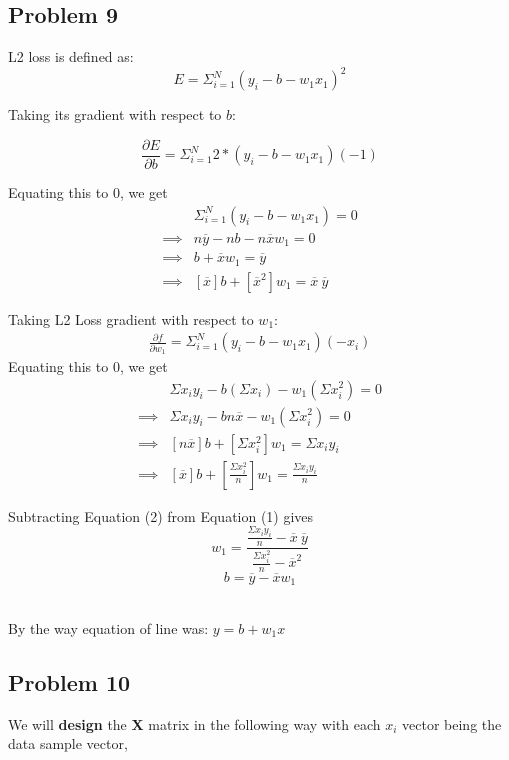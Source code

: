 \documentclass[12pt]{article}
\begin{document}
\subsection{Problem 9}

L2 loss is defined as:
\[E = \Sigma_{i=1}^N (y_i - b - w_1 x_1)^2 \]

Taking its gradient with respect to $b$:

\[\frac{\partial E}{\partial b} = \Sigma_{i=1}^N 2*(y_i - b - w_1 x_1)(-1)\]

Equating this to 0, we get 
\begin{align}
&\Sigma_{i=1}^N (y_i - b - w_1 x_1) = 0 \nonumber \\ 
\implies & n\overline{y} - nb - n\overline{x}w_1 = 0 \nonumber\\ 
\implies & b + \overline{x}w_1 = \overline{y} \nonumber \\
\implies & [\overline{x}]b + [\overline{x}^2]w_1 = \overline{x} \ \overline{y} 
\end{align}

Taking L2 Loss gradient with respect to $w_1$:
\begin{align*}
\frac{\partial f}{\partial w_1} = \Sigma_{i=1}^N (y_i - b - w_1 x_1)(-x_i)
\end{align*}
Equating this to 0, we get 
\begin{align}
    & \Sigma x_i y_i - b(\Sigma x_i) - w_1(\Sigma x_i^2) = 0 \nonumber \\
    \implies & \Sigma x_i y_i - bn\overline{x} - w_1(\Sigma x_i^2) = 0 \nonumber \\
    \implies & [n\overline{x}]b + [\Sigma x_i^2]w_1  = \Sigma x_i y_i \nonumber \\
    \implies & [\overline{x}]b + [\frac{\Sigma x_i^2}{n}]w_1  = \frac{\Sigma x_i y_i}{n}
\end{align}

Subtracting Equation (2) from Equation (1) gives
\[w_1 = \frac {\frac{\Sigma x_i y_i}{n} - \overline{x} \ \overline{y}}{\frac{\Sigma x_i^2}{n} - \overline{x}^2}\]
\[b = \overline{y} - \overline{x}w_1\]

\\
By the way equation of line was: $y = b + w_1 x$


\subsection{Problem 10}

\vspace{0.5em}
We will \textbf{design} the \textbf{X} matrix in the following way with each $x_i$ vector being the data sample vector,
\end{document}
